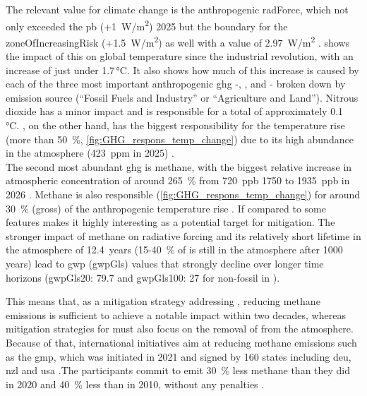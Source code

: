 The relevant value for climate change is the anthropogenic \gls{radForce}, which not only exceeded the \acrshort{pb} (+1~W/m\textsuperscript{2}) 2025 but the boundary for the \gls{zoneOfIncreasingRisk} (+1.5~W/m\textsuperscript{2}) as well with a value of 2.97~W/m\textsuperscript{2} \parencite[p.\,13]{planetaryboundariessciencepbsciencePlanetaryHealthCheck2025, irfanChapterEightRadiative2024}.  shows the impact of this on global temperature since the industrial revolution, with an increase of just under 1.7\,°C.
It also shows how much of this increase is caused by each of the three most important anthropogenic \acrfull{ghg} -, , and  - broken down by emission source (“Fossil Fuels and Industry” or “Agriculture and Land”). Nitrous dioxide has a minor impact and is responsible for a total of approximately 0.1 \,°C. , on the other hand, has the biggest responsibility for the temperature rise (more than 50~\%, \cref{fig:GHG_respons_temp_change}) due to its high abundance in the atmosphere (423~ppm in 2025) \parencite{teamAnnualGreenhouseGas2025, planetaryboundariessciencepbsciencePlanetaryHealthCheck2025}.\\

The second most abundant \acrshort{ghg} is methane, with the biggest relative increase in atmospheric concentration of around 265~\% from 720~ppb 1750 to 1935~ppb in 2026 \parencite{appelhansUnterschatztesTreibhausgasMethan2025, planetaryboundariessciencepbsciencePlanetaryHealthCheck2025, thoningTrendsGloballyaveragedCH42022}. Methane is also responsible (\cref{fig:GHG_respons_temp_change}) for around 30~\% (\gls{gross}) of the anthropogenic temperature rise \citep[p.\,9]{appelhansUnterschatztesTreibhausgasMethan2025}. If compared to  some features makes it highly interesting as a potential target for mitigation. 
The stronger impact of methane on radiative forcing and its relatively short lifetime in the atmosphere of 12.4~years (15-40~\% of  is still in the atmosphere after 1000 years) \parencite{appelhansUnterschatztesTreibhausgasMethan2025} lead to \acrlong{gwp} (\gls{gwpGls}) values that strongly decline over longer time horizons (\gls{gwpGls}20: 79.7 and \gls{gwpGls}100: 27 for non-fossil  in \textcite[Table~7.15]{IPPCC_AR6_Chapter7_GWP}).

This means that, as a mitigation strategy addressing , reducing methane emissions is sufficient to achieve a notable impact within two decades, whereas mitigation strategies for  must also focus on the removal of  from the atmosphere. Because of that, international initiatives aim at reducing methane emissions such as the \acrfull{gmp}, which was initiated in 2021 and signed by 160 states including \acrfull{deu}, \acrfull{nzl} and \acrfull{usa} \parencite{ccacHomepageGlobalMethane}.The participants commit to emit 30~\% less methane than they did in 2020 and 40~\% less than in 2010, without any penalties \parencite{appelhansUnterschatztesTreibhausgasMethan2025}.

